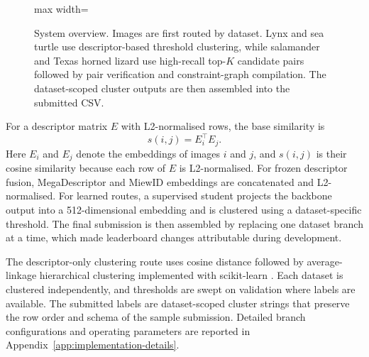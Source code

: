 \documentclass{ceurart}
\begin{document}
\begin{figure}[ht]
\begin{adjustbox}{max width=\linewidth}
  \end{adjustbox}
  \caption{System overview. Images are first routed by dataset. Lynx and sea turtle use descriptor-based threshold clustering, while salamander and Texas horned lizard use high-recall top-$K$ candidate pairs followed by pair verification and constraint-graph compilation. The dataset-scoped cluster outputs are then assembled into the submitted CSV.}
  \label{fig:overview}
\end{figure}

For a descriptor matrix $E$ with L2-normalised rows, the base similarity is
\begin{equation}
  s(i,j)=E_i^\top E_j .
\end{equation}
Here $E_i$ and $E_j$ denote the embeddings of images $i$ and $j$, and $s(i,j)$ is their cosine similarity because each row of $E$ is L2-normalised.
For frozen descriptor fusion, MegaDescriptor and MiewID embeddings are concatenated and L2-normalised. For learned routes, a supervised student projects the backbone output into a 512-dimensional embedding and is clustered using a dataset-specific threshold. The final submission is then assembled by replacing one dataset branch at a time, which made leaderboard changes attributable during development.

The descriptor-only clustering route uses cosine distance followed by average-linkage hierarchical clustering implemented with scikit-learn \cite{scikit-learn}. Each dataset is clustered independently, and thresholds are swept on validation where labels are available. The submitted labels are dataset-scoped cluster strings that preserve the row order and schema of the sample submission. Detailed branch configurations and operating parameters are reported in Appendix~\ref{app:implementation-details}.
\end{document}
